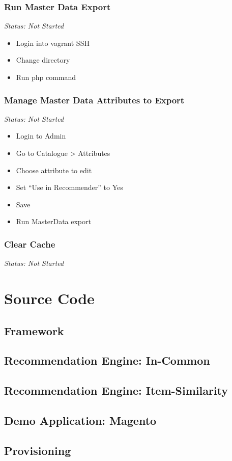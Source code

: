 \subsubsection{Run Master Data Export}

\emph{Status: Not Started}

\begin{itemize}
\item Login into vagrant SSH
\item Change directory
\item Run php command
\end{itemize}

\subsubsection{Manage Master Data Attributes to Export}

\emph{Status: Not Started}

\begin{itemize}
\item Login to Admin
\item Go to Catalogue > Attributes
\item Choose attribute to edit
\item Set ``Use in Recommender'' to Yes
\item Save
\item Run MasterData export
\end{itemize}

\subsubsection{Clear Cache}

\emph{Status: Not Started}


\section{Source Code}

\subsection{Framework}

% 

\subsection{Recommendation Engine: In-Common}

% 

\subsection{Recommendation Engine: Item-Similarity}

% 

\subsection{Demo Application: Magento}

% 

\subsection{Provisioning}

% 